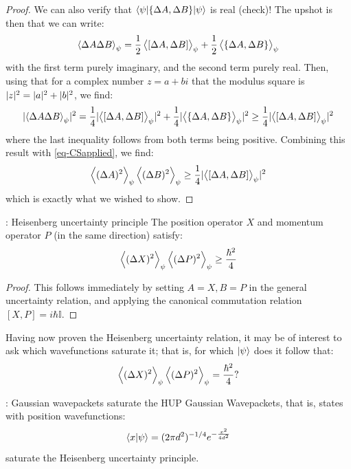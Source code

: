 \begin{proof}
    We can also verify that $\langle \psi \rvert\{\Delta A, \Delta B\}\lvert \psi \rangle$ is real (check)! The upshot is then that we can write:
    \begin{equation}
        \left< \Delta A\Delta B \right>_\psi = \frac{1}{2}\left< [\Delta A, \Delta B] \right>_\psi + \frac{1}{2}\left< \{\Delta A, \Delta B\} \right>_\psi
    \end{equation}
    with the first term purely imaginary, and the second term purely real. Then, using that for a complex number $z = a + bi$ that the modulus square is $\lvert z \rvert^2 = \lvert a \rvert^2 + \lvert b \rvert^2$, we find:
    \begin{equation}
        \lvert \left< \Delta A\Delta B \right>_\psi \rvert^2 = \frac{1}{4}\lvert \left< [\Delta A, \Delta B] \right>_\psi \rvert^2 + \frac{1}{4}\lvert \left< \{\Delta A, \Delta B\} \right>_\psi \rvert^2 \geq \frac{1}{4}\lvert \left< [\Delta A, \Delta B] \right>_\psi \rvert^2
    \end{equation}
    where the last inequality follows from both terms being positive. Combining this result with \eqref{eq-CSapplied}, we find:
    \begin{equation}
        \left< (\Delta A)^2 \right>_\psi\left< (\Delta B)^2 \right>_\psi \geq \frac{1}{4}\lvert \left< [\Delta A, \Delta B] \right>_\psi \rvert^2
    \end{equation}
    which is exactly what we wished to show.
\end{proof}

\begin{corbox}{: Heisenberg uncertainty principle}
    The position operator $X$ and momentum operator $P$ (in the same direction) satisfy:
    \begin{equation}
        \left< (\Delta X)^2 \right>_\psi\left< (\Delta P)^2 \right>_\psi \geq \frac{\hbar^2}{4}
    \end{equation}
\end{corbox}
\begin{proof}
    This follows immediately by setting $A = X, B = P$ in the general uncertainty relation, and applying the canonical commutation relation $[X, P] = i\hbar \mathbb{I}$. 
\end{proof}

Having now proven the Heisenberg uncertainty relation, it may be of interest to ask which wavefunctions saturate it; that is, for which $\lvert \psi \rangle$ does it follow that:
\begin{equation}
    \left< (\Delta X)^2 \right>_\psi\left< (\Delta P)^2 \right>_\psi = \frac{\hbar^2}{4}?
\end{equation} 

\begin{propbox}{: Gaussian wavepackets saturate the HUP}
    Gaussian Wavepackets, that is, states with position wavefunctions:
    \begin{equation}
        \langle x \lvert \psi \rangle = (2\pi d^2)^{-1/4}e^{-\frac{x^2}{4d^2}}
    \end{equation}
    saturate the Heisenberg uncertainty principle.
\end{propbox}

